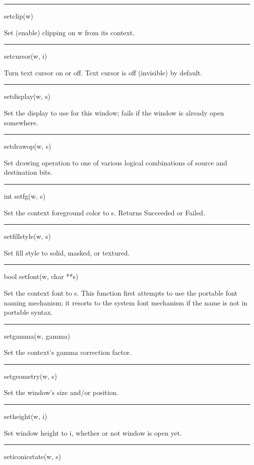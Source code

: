 \bigskip\hrule\vspace{0.1cm}
\noindent
setclip(w)


Set (enable) clipping on \textsf{w} from its context.


\bigskip\hrule\vspace{0.1cm}
\noindent
setcursor(w, i)


Turn text cursor on or off. Text cursor is off (invisible) by default.


\bigskip\hrule\vspace{0.1cm}
\noindent
setdisplay(w, s)


Set the display to use for this window; fails if the window is already
open somewhere.


\bigskip\hrule\vspace{0.1cm}
\noindent
setdrawop(w, s)


Set drawing operation to one of various logical combinations of source
and destination bits.


\bigskip\hrule\vspace{0.1cm}
\noindent
int setfg(w, s)


Set the context foreground color to s. Returns Succeeded or Failed.


\bigskip\hrule\vspace{0.1cm}
\noindent
setfillstyle(w, s)


Set fill style to solid, masked, or textured.


\bigskip\hrule\vspace{0.1cm}
\noindent
bool setfont(w, char **s)


Set the context font to \textsf{s}. This function first attempts to
use the portable font naming mechanism; it resorts to the system font
mechanism if the name is not in portable syntax.


\bigskip\hrule\vspace{0.1cm}
\noindent
setgamma(w, gamma)


Set the context's gamma correction factor.


\bigskip\hrule\vspace{0.1cm}
\noindent
setgeometry(w, s)


Set the window's size and/or position.


\bigskip\hrule\vspace{0.1cm}
\noindent
setheight(w, i)


Set window height to \textsf{i}, whether or not window is open yet.


\bigskip\hrule\vspace{0.1cm}
\noindent
seticonicstate(w, s)


